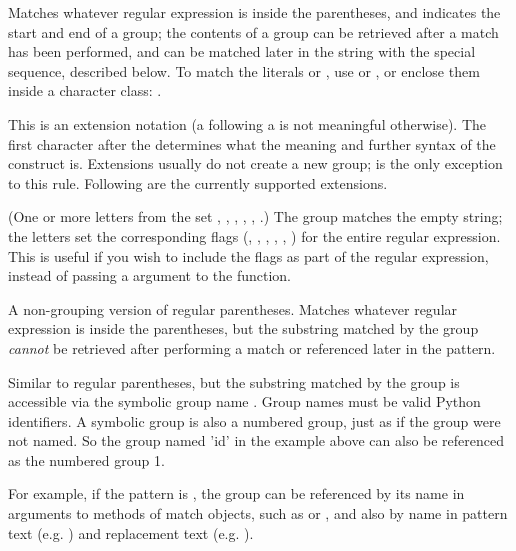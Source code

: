 \begin{list}{}{\leftmargin 0.7in }
\item[\code{(...)}] Matches whatever regular expression is inside the
parentheses, and indicates the start and end of a group; the contents
of a group can be retrieved after a match has been performed, and can
be matched later in the string with the  special
sequence, described below.  To match the literals \character{(} or
, use \regexp{\e(} or \regexp{\e)}, or enclose them
inside a character class: \regexp{[(] [)]}.

\item[\code{(?...)}] This is an extension notation (a 
following a \character{(} is not meaningful otherwise).  The first
character after the  
determines what the meaning and further syntax of the construct is.
Extensions usually do not create a new group;
 is the only exception to this rule.
Following are the currently supported extensions.

\item[\code{(?iLmsux)}] (One or more letters from the set ,
, , , ,
.)  The group matches the empty string; the letters set
the corresponding flags (, ,
, , , )
for the entire regular expression.  This is useful if you wish to
include the flags as part of the regular expression, instead of
passing a  argument to the  function.

\item[\code{(?:...)}] A non-grouping version of regular parentheses.
Matches whatever regular expression is inside the parentheses, but the
substring matched by the 
group \emph{cannot} be retrieved after performing a match or
referenced later in the pattern. 

\item[\code{(?P<\var{name}>...)}] Similar to regular parentheses, but
the substring matched by the group is accessible via the symbolic group
name .  Group names must be valid Python identifiers.  A
symbolic group is also a numbered group, just as if the group were not
named.  So the group named 'id' in the example above can also be
referenced as the numbered group 1.

For example, if the pattern is
, the group can be referenced by its
name in arguments to methods of match objects, such as 
or , and also by name in pattern text
(e.g. ) and replacement text (e.g. ).


\end{list}
